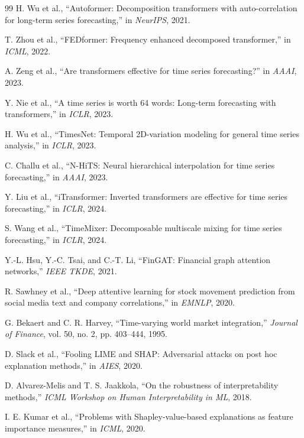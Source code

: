 \documentclass[conference]{IEEEtran}
\begin{document}
\begin{thebibliography}{99}
H. Wu et al., ``Autoformer: Decomposition transformers with auto-correlation for long-term series forecasting,'' in \textit{NeurIPS}, 2021.

T. Zhou et al., ``FEDformer: Frequency enhanced decomposed transformer,'' in \textit{ICML}, 2022.

A. Zeng et al., ``Are transformers effective for time series forecasting?'' in \textit{AAAI}, 2023.

Y. Nie et al., ``A time series is worth 64 words: Long-term forecasting with transformers,'' in \textit{ICLR}, 2023.

H. Wu et al., ``TimesNet: Temporal 2D-variation modeling for general time series analysis,'' in \textit{ICLR}, 2023.

C. Challu et al., ``N-HiTS: Neural hierarchical interpolation for time series forecasting,'' in \textit{AAAI}, 2023.

Y. Liu et al., ``iTransformer: Inverted transformers are effective for time series forecasting,'' in \textit{ICLR}, 2024.

S. Wang et al., ``TimeMixer: Decomposable multiscale mixing for time series forecasting,'' in \textit{ICLR}, 2024.

Y.-L. Hsu, Y.-C. Tsai, and C.-T. Li, ``FinGAT: Financial graph attention networks,'' \textit{IEEE TKDE}, 2021.

R. Sawhney et al., ``Deep attentive learning for stock movement prediction from social media text and company correlations,'' in \textit{EMNLP}, 2020.

G. Bekaert and C. R. Harvey, ``Time-varying world market integration,'' \textit{Journal of Finance}, vol. 50, no. 2, pp. 403--444, 1995.

D. Slack et al., ``Fooling LIME and SHAP: Adversarial attacks on post hoc explanation methods,'' in \textit{AIES}, 2020.

D. Alvarez-Melis and T. S. Jaakkola, ``On the robustness of interpretability methods,'' \textit{ICML Workshop on Human Interpretability in ML}, 2018.

I. E. Kumar et al., ``Problems with Shapley-value-based explanations as feature importance measures,'' in \textit{ICML}, 2020.


\end{thebibliography}
\end{document}
